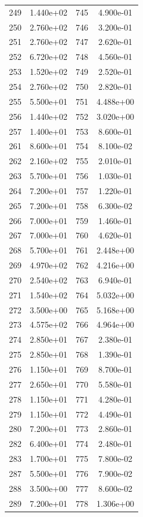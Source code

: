 \documentclass[12pt]{article}
\begin{document}
\begin{longtable}{@{}cccc@{}}
249 & 1.440e+02 & 745 & 4.900e-01 \\
250 & 2.760e+02 & 746 & 3.200e-01 \\
251 & 2.760e+02 & 747 & 2.620e-01 \\
252 & 6.720e+02 & 748 & 4.560e-01 \\
253 & 1.520e+02 & 749 & 2.520e-01 \\
254 & 2.760e+02 & 750 & 2.820e-01 \\
255 & 5.500e+01 & 751 & 4.488e+00 \\
256 & 1.440e+02 & 752 & 3.020e+00 \\
257 & 1.400e+01 & 753 & 8.600e-01 \\
261 & 8.600e+01 & 754 & 8.100e-02 \\
262 & 2.160e+02 & 755 & 2.010e-01 \\
263 & 5.700e+01 & 756 & 1.030e-01 \\
264 & 7.200e+01 & 757 & 1.220e-01 \\
265 & 7.200e+01 & 758 & 6.300e-02 \\
266 & 7.000e+01 & 759 & 1.460e-01 \\
267 & 7.000e+01 & 760 & 4.620e-01 \\
268 & 5.700e+01 & 761 & 2.448e+00 \\
269 & 4.970e+02 & 762 & 4.216e+00 \\
270 & 2.540e+02 & 763 & 6.940e-01 \\
271 & 1.540e+02 & 764 & 5.032e+00 \\
272 & 3.500e+00 & 765 & 5.168e+00 \\
273 & 4.575e+02 & 766 & 4.964e+00 \\
274 & 2.850e+01 & 767 & 2.380e-01 \\
275 & 2.850e+01 & 768 & 1.390e-01 \\
276 & 1.150e+01 & 769 & 8.700e-01 \\
277 & 2.650e+01 & 770 & 5.580e-01 \\
278 & 1.150e+01 & 771 & 4.280e-01 \\
279 & 1.150e+01 & 772 & 4.490e-01 \\
280 & 7.200e+01 & 773 & 2.860e-01 \\
282 & 6.400e+01 & 774 & 2.480e-01 \\
283 & 1.700e+01 & 775 & 7.800e-02 \\
287 & 5.500e+01 & 776 & 7.900e-02 \\
288 & 3.500e+00 & 777 & 8.600e-02 \\
289 & 7.200e+01 & 778 & 1.306e+00 \\

\end{longtable}
\end{document}
